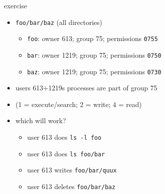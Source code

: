 \begin{frame}{exercise}
\begin{itemize}
\item \texttt{foo/bar/baz} (all directories)
    \begin{itemize}
    \item \texttt{foo}: owner 613; group 75; permissions \texttt{0755}
    \item \texttt{bar}: owner 1219; group 75; permissions \texttt{0750}
    \item \texttt{baz}: owner 1219; group 75; permissions \texttt{0730}
    \end{itemize}
\item users 613+1219s processes are part of group 75
\item (1 = execute/search; 2 = write; 4 = read)
\item which will work?
    \begin{itemize}
    \item user 613 does \texttt{ls -l foo}
    \item user 613 does \texttt{ls foo/bar}
    \item user 613 writes \texttt{foo/bar/quux}
    \item user 613 deletes \texttt{foo/bar/baz}
    \end{itemize}
\end{itemize}
\end{frame}
